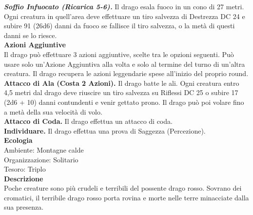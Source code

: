 \begin{multicols}{2}
\emph{\textbf{Soffio Infuocato (Ricarica 5-6).}} Il drago esala fuoco in un cono di 27 metri. Ogni creatura in quell'area deve effettuare un tiro salvezza di Destrezza DC 24 e subire 91 (26d6) danni da fuoco se fallisce il tiro salvezza, o la metà di questi danni se lo riesce.\\
\textbf{Azioni Aggiuntive}\\
Il drago può effettuare 3 azioni aggiuntive, scelte tra le opzioni seguenti. Può usare solo un'Azione Aggiuntiva alla volta e solo al termine del turno di un'altra creatura. Il drago recupera le azioni leggendarie spese all'inizio del proprio round.\\
\textbf{Attacco di Ala (Costa 2 Azioni).} Il drago batte le ali. Ogni creatura entro 4,5 metri dal  drago deve riuscire un tiro salvezza su Riflessi DC 25 o subire 17 (2d6 + 10) danni contundenti e venir gettato prono. Il drago può poi volare fino a metà della sua velocità di volo.\\
\textbf{Attacco di Coda.} Il drago effettua un attacco di coda.\\
\textbf{Individuare.} Il drago effettua una prova di Saggezza (Percezione).\\	
\textbf{Ecologia}\\
Ambiente: Montagne calde\\
Organizzazione: Solitario\\
Tesoro: Triplo\\
\textbf{Descrizione}\\
Poche creature sono più crudeli e terribili del possente drago rosso. Sovrano dei cromatici, il terribile drago rosso porta rovina e morte nelle terre minacciate dalla sua presenza.\\


\end{multicols}
